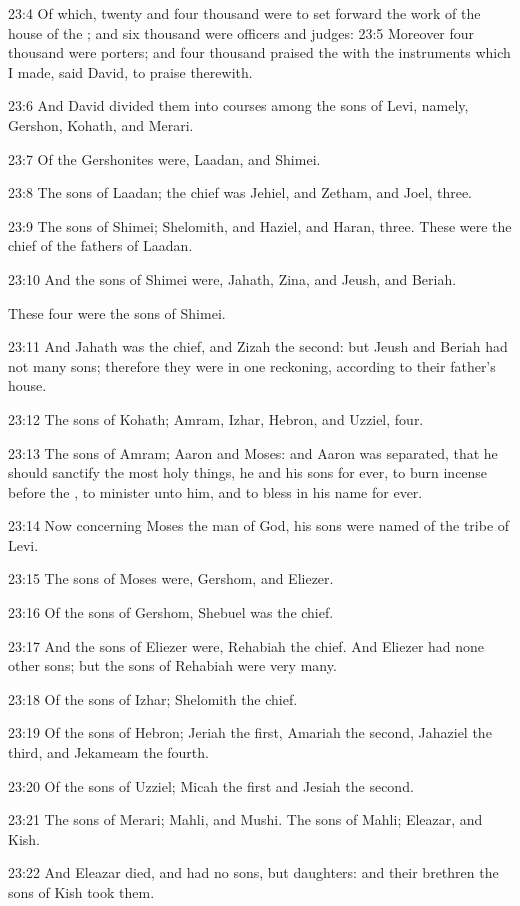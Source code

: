 23:4 Of which, twenty and four thousand were to set forward the work of the house of the \LORD; and six thousand were officers and judges: 23:5 Moreover four thousand were porters; and four thousand praised the \LORD with the instruments which I made, said David, to praise therewith.

23:6 And David divided them into courses among the sons of Levi, namely, Gershon, Kohath, and Merari.

23:7 Of the Gershonites were, Laadan, and Shimei.

23:8 The sons of Laadan; the chief was Jehiel, and Zetham, and Joel, three.

23:9 The sons of Shimei; Shelomith, and Haziel, and Haran, three.  These were the chief of the fathers of Laadan.

23:10 And the sons of Shimei were, Jahath, Zina, and Jeush, and Beriah.

These four were the sons of Shimei.

23:11 And Jahath was the chief, and Zizah the second: but Jeush and Beriah had not many sons; therefore they were in one reckoning, according to their father's house.

23:12 The sons of Kohath; Amram, Izhar, Hebron, and Uzziel, four.

23:13 The sons of Amram; Aaron and Moses: and Aaron was separated, that he should sanctify the most holy things, he and his sons for ever, to burn incense before the \LORD, to minister unto him, and to bless in his name for ever.

23:14 Now concerning Moses the man of God, his sons were named of the tribe of Levi.

23:15 The sons of Moses were, Gershom, and Eliezer.

23:16 Of the sons of Gershom, Shebuel was the chief.

23:17 And the sons of Eliezer were, Rehabiah the chief. And Eliezer had none other sons; but the sons of Rehabiah were very many.

23:18 Of the sons of Izhar; Shelomith the chief.

23:19 Of the sons of Hebron; Jeriah the first, Amariah the second, Jahaziel the third, and Jekameam the fourth.

23:20 Of the sons of Uzziel; Micah the first and Jesiah the second.

23:21 The sons of Merari; Mahli, and Mushi. The sons of Mahli; Eleazar, and Kish.

23:22 And Eleazar died, and had no sons, but daughters: and their brethren the sons of Kish took them.

